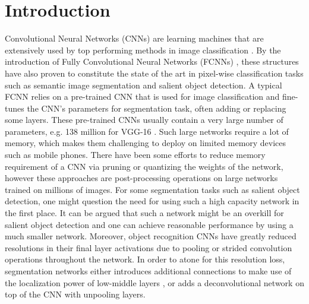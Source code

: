 \documentclass[a4paper,conference]{IEEEtran}
\begin{document}




%
\IEEEpeerreviewmaketitle



\section{Introduction}
{C}{onvolutional} Neural Networks (CNNs) are learning machines that are extensively used by top performing methods in image classification \cite{Krizhevsky,Simonyan,Szegedy,He}.
By the introduction of Fully Convolutional Neural Networks (FCNNs) \cite{Long}, these structures have also proven to constitute the state of the art in pixel-wise classification tasks such as semantic image segmentation and salient object detection.
A typical FCNN relies on a pre-trained CNN that is used for image classification and fine-tunes the CNN's parameters for segmentation task, often adding or replacing some layers.
These pre-trained CNNs usually contain a very large number of parameters, e.g. 138 million for VGG-16 \cite{Simonyan}.
Such large networks require a lot of memory, which makes them challenging to deploy on limited memory devices such as mobile phones.
There have been some efforts to reduce memory requirement of a CNN via pruning \cite{Hanc} or quantizing \cite{Guptac} the weights of the network, however these approaches are post-processing operations on large networks trained on millions of images. 
For some segmentation tasks such as salient object detection, one might question the need for using such a high capacity network in the first place.
It can be argued that such a network might be an overkill for salient object detection and one can achieve reasonable performance by using a much smaller network.
Moreover, object recognition CNNs have greatly reduced resolutions in their final layer activations due to pooling or strided convolution operations throughout the network.
In order to atone for this resolution loss, segmentation networks either introduces additional connections to make use of the localization power of low-middle layers \cite{Long,Hariharan}, or adds a deconvolutional network on top of the CNN \cite{Badrinarayanan, Noh} with unpooling layers. 
\end{document}
